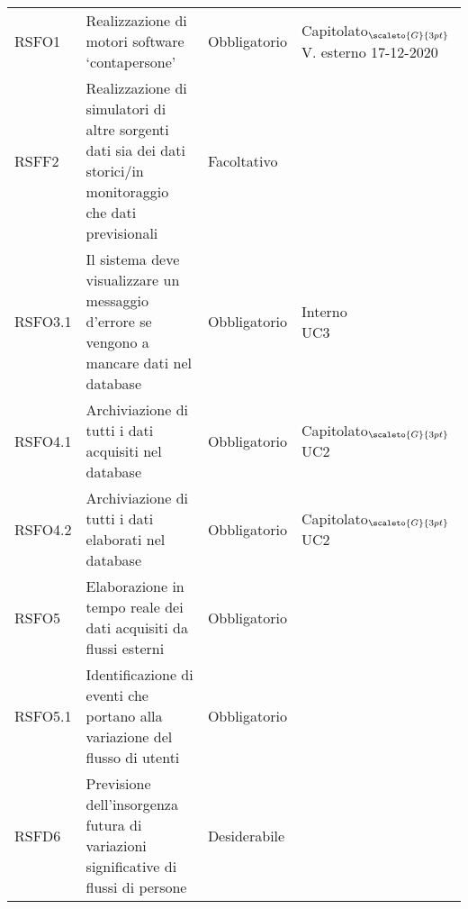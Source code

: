 \def\tabularxcolumn#1{m{#1}}
{

	\begin{center}
		\renewcommand{\arraystretch}{1.4}
		\begin{longtable}{|p{3cm}|p{4cm}|p{4cm}|p{4cm}|}
			\hline
			\rowcolor{airforceblue}
			\makecell[c]{\textbf{Codice RS}} & \makecell[c]{\textbf{Descrizione}} & \makecell[c]{\textbf{Tipo di requisito}} & \makecell[c]{\textbf{Fonte}} \\
			\hline
			\centering RSFO1 & Realizzazione di motori software ‘contapersone’  &\centering  Obbligatorio & \makecell[tc]{Capitolato$_{\scaleto{G}{3pt}}$ \\ V. esterno 17-12-2020 } \\
			\hline
			\centering RSFF2 & Realizzazione di simulatori di altre sorgenti dati sia dei dati storici/in monitoraggio che dati previsionali & \centering Facoltativo & \makecell[tc]{Capitolato$_{\scaleto{G}{3pt}}$ } \\
			\hline
			\centering RSFO3.1  & Il sistema deve visualizzare un messaggio d'errore se vengono a mancare dati nel database   &\centering  Obbligatorio & \makecell[tc]{Interno\\UC3}  \\
			\hline
			\centering RSFO4.1 & Archiviazione di tutti i dati acquisiti nel database & \centering Obbligatorio & \makecell[tc]{Capitolato$_{\scaleto{G}{3pt}}$ \\ UC2}  \\
			\hline
			\centering RSFO4.2 & Archiviazione di tutti i dati elaborati nel database & \centering Obbligatorio & \makecell[tc]{Capitolato$_{\scaleto{G}{3pt}}$ \\ UC2}  \\
			\hline
			\centering RSFO5 & Elaborazione in tempo reale dei dati acquisiti da flussi esterni &\centering  Obbligatorio & \makecell[tc]{Capitolato$_{\scaleto{G}{3pt}}$}  \\
			\hline
			\centering RSFO5.1 & Identificazione di eventi che portano alla variazione del flusso di utenti &\centering  Obbligatorio & \makecell[tc]{Capitolato$_{\scaleto{G}{3pt}}$}  \\
			\hline
			\centering RSFD6 & Previsione dell'insorgenza futura di variazioni significative di flussi di persone & \centering Desiderabile & \makecell[tc]{Capitolato$_{\scaleto{G}{3pt}}$ }  \\

\end{longtable}
\end{center}}
